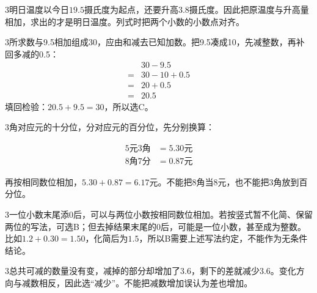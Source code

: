 \documentclass[multi=snippet,border={5bp 20bp 5bp 5bp}]{standalone}
\newenvironment{snippet}[3]{\begin{minipage}{#1bp}\color{answerred}\fontsize{#2}{#3}\selectfont\raggedright}{\end{minipage}}
\begin{document}
\begin{snippet}{505}{11.5}{14}\begin{multicols}{3}\raggedcolumns 明日温度以今日\(19.5\)\allowbreak 摄氏度为起点，还要升高\(3.8\)\allowbreak 摄氏度。因此把原温度与升高量相加，求出的才是明日温度。列式时把两个小数的小数点对齐。\end{multicols}\end{snippet}
\begin{snippet}{505}{11.5}{14}\begin{multicols}{3}\raggedcolumns 所求数与9.5相加组成30，应由和减去已知加数。把9.5凑成10，先减整数，再补回多减的0.5：\[\begin{aligned}&30-9.5\\={}&30-10+0.5\\={}&20+0.5\\={}&20.5\end{aligned}\]填回检验：\(20.5+9.5=30\)\allowbreak ，所以选C。\end{multicols}\end{snippet}
\begin{snippet}{505}{11.5}{14}\begin{multicols}{3}\raggedcolumns 角对应元的十分位，分对应元的百分位，先分别换算：\par\noindent\[\displaystyle \begin{aligned}5\text{元}3\text{角}&=5.30\text{元}\\8\text{角}7\text{分}&=0.87\text{元}\end{aligned}\]\par 再按相同数位相加，\(5.30+0.87=6.17\)\allowbreak 元。不能把8角当8元，也不能把3角放到百分位。\end{multicols}\end{snippet}
\begin{snippet}{505}{11.5}{14}\begin{multicols}{3}\raggedcolumns 一位小数末尾添0后，可以与两位小数按相同数位相加。若按竖式暂不化简、保留两位的写法，可选B；但去掉结果末尾的0后，可能是一位小数，甚至成为整数。比如\(1.2+0.30=1.50\)\allowbreak ，化简后为\(1.5\)\allowbreak ，所以B需要上述写法约定，不能作为无条件结论。\end{multicols}\end{snippet}
\begin{snippet}{505}{11.5}{14}\begin{multicols}{3}\raggedcolumns 总共可减的数量没有变，减掉的部分却增加了\(3.6\)\allowbreak ，剩下的差就减少\(3.6\)\allowbreak 。变化方向与减数相反，因此选“减少”。不能把减数增加误认为差也增加。\end{multicols}\end{snippet}
\end{document}
